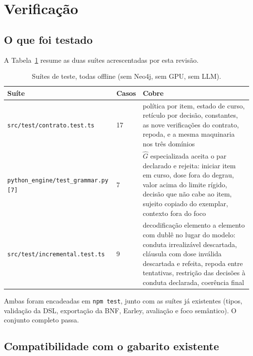 \documentclass[11pt,a4paper]{article}
\begin{document}
\section{Verificação}

\subsection{O que foi testado}

A Tabela~\ref{tab:testes} resume as duas suítes acrescentadas por esta revisão.

\begin{table}[h]
\centering
\small
\caption{Suítes de teste, todas offline (sem Neo4j, sem GPU, sem LLM).}
\label{tab:testes}
\begin{tabular}{@{}p{5.2cm}p{2.0cm}p{7.4cm}@{}}
\toprule
\textbf{Suíte} & \textbf{Casos} & \textbf{Cobre} \\
\midrule
\texttt{src/test/contrato.test.ts} & 17 &
política por item, estado de curso, retículo por decisão, constantes,
as nove verificações do contrato, repoda, e a mesma maquinaria nos três domínios \\
\addlinespace
\texttt{python\_engine/test\_grammar.py} \texttt{[7]} & 7 &
$\hat{G}$ especializada aceita o par declarado e rejeita: iniciar item em curso,
dose fora do degrau, valor acima do limite rígido, decisão que não cabe ao item,
sujeito copiado do exemplar, contexto fora do foco \\
\addlinespace
\texttt{src/test/incremental.test.ts} & 9 &
decodificação elemento a elemento com dublê no lugar do modelo: conduta
irrealizável descartada, cláusula com dose inválida descartada e refeita, repoda
entre tentativas, restrição das decisões à conduta declarada, coerência final \\
\bottomrule
\end{tabular}
\end{table}

Ambas foram encadeadas em \texttt{npm test}, junto com as suítes já existentes
(tipos, validação da DSL, exportação da BNF, Earley, avaliação e foco
semântico). O conjunto completo passa.

\subsection{Compatibilidade com o gabarito existente}
\end{document}
